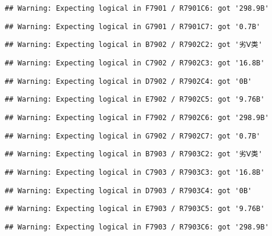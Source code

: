 \documentclass[
]{article}
\begin{document}
\begin{verbatim}
## Warning: Expecting logical in F7901 / R7901C6: got '298.9B'
\end{verbatim}

\begin{verbatim}
## Warning: Expecting logical in G7901 / R7901C7: got '0.7B'
\end{verbatim}

\begin{verbatim}
## Warning: Expecting logical in B7902 / R7902C2: got '劣Ⅴ类'
\end{verbatim}

\begin{verbatim}
## Warning: Expecting logical in C7902 / R7902C3: got '16.8B'
\end{verbatim}

\begin{verbatim}
## Warning: Expecting logical in D7902 / R7902C4: got '0B'
\end{verbatim}

\begin{verbatim}
## Warning: Expecting logical in E7902 / R7902C5: got '9.76B'
\end{verbatim}

\begin{verbatim}
## Warning: Expecting logical in F7902 / R7902C6: got '298.9B'
\end{verbatim}

\begin{verbatim}
## Warning: Expecting logical in G7902 / R7902C7: got '0.7B'
\end{verbatim}

\begin{verbatim}
## Warning: Expecting logical in B7903 / R7903C2: got '劣Ⅴ类'
\end{verbatim}

\begin{verbatim}
## Warning: Expecting logical in C7903 / R7903C3: got '16.8B'
\end{verbatim}

\begin{verbatim}
## Warning: Expecting logical in D7903 / R7903C4: got '0B'
\end{verbatim}

\begin{verbatim}
## Warning: Expecting logical in E7903 / R7903C5: got '9.76B'
\end{verbatim}

\begin{verbatim}
## Warning: Expecting logical in F7903 / R7903C6: got '298.9B'
\end{verbatim}
\end{document}
